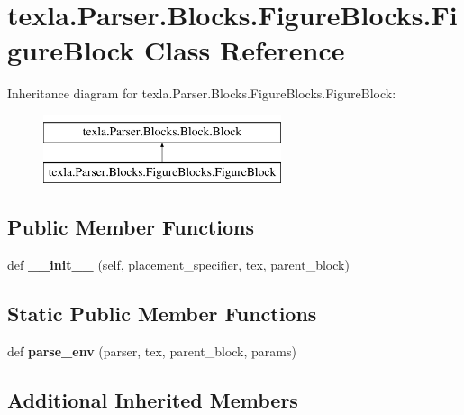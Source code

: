\hypertarget{classtexla_1_1Parser_1_1Blocks_1_1FigureBlocks_1_1FigureBlock}{}\section{texla.\+Parser.\+Blocks.\+Figure\+Blocks.\+Figure\+Block Class Reference}
\label{classtexla_1_1Parser_1_1Blocks_1_1FigureBlocks_1_1FigureBlock}
Inheritance diagram for texla.\+Parser.\+Blocks.\+Figure\+Blocks.\+Figure\+Block\+:\begin{figure}[H]
\begin{center}
\leavevmode
\includegraphics[height=2.000000cm]{classtexla_1_1Parser_1_1Blocks_1_1FigureBlocks_1_1FigureBlock}
\end{center}
\end{figure}
\subsection*{Public Member Functions}
\begin{DoxyCompactItemize}
\item 
\hypertarget{classtexla_1_1Parser_1_1Blocks_1_1FigureBlocks_1_1FigureBlock_a87e9d52d5cf3aa8a75d8be4997af262a}{}\label{classtexla_1_1Parser_1_1Blocks_1_1FigureBlocks_1_1FigureBlock_a87e9d52d5cf3aa8a75d8be4997af262a} 
def {\bfseries \+\_\+\+\_\+init\+\_\+\+\_\+} (self, placement\+\_\+specifier, tex, parent\+\_\+block)
\end{DoxyCompactItemize}
\subsection*{Static Public Member Functions}
\begin{DoxyCompactItemize}
\item 
\hypertarget{classtexla_1_1Parser_1_1Blocks_1_1FigureBlocks_1_1FigureBlock_a28e379084a4bff05e9e2923a5f2c4b17}{}\label{classtexla_1_1Parser_1_1Blocks_1_1FigureBlocks_1_1FigureBlock_a28e379084a4bff05e9e2923a5f2c4b17} 
def {\bfseries parse\+\_\+env} (parser, tex, parent\+\_\+block, params)
\end{DoxyCompactItemize}
\subsection*{Additional Inherited Members}


